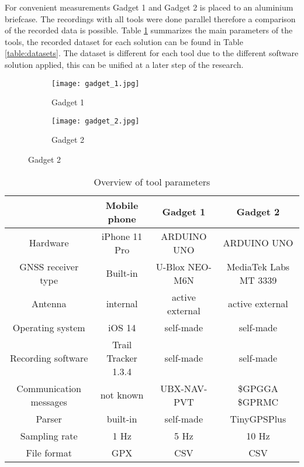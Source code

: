\documentclass{article}
\begin{document}
			For convenient measurements Gadget 1 and Gadget 2 is placed to an aluminium briefcase. The recordings with all tools were done parallel therefore a comparison of the recorded data is possible. Table \ref{table:toolparams} summarizes the main parameters of the tools, the recorded dataset for each solution can be found in Table \ref{table:datasets}. The dataset is different for each tool due to the different software solution applied, this can be unified at a later step of the research.
			\begin{figure}[h]
		   		\centering
		     	\begin{subfigure}[b]{0.45\textwidth}
		      		\centering
		      	  	\texttt{[image: gadget\_1.jpg]}
		      	   \caption{Gadget 1}
		      	   \label{fig:gadget1}
		     	\end{subfigure}
		     	\begin{subfigure}[b]{0.45\textwidth}
		      	   \centering
		      	   \texttt{[image: gadget\_2.jpg]}
		      	   \caption{Gadget 2}
		      	   \label{fig:gadget2}
		     	\end{subfigure}
		      \caption{Gadget 2}
		      \label{fig:gadgets}
			\end{figure}		
			\begin{table}[h]
				\centering
				\begin{tabular}{|c|c|c|c|}
					\hline 
					& Mobile phone & Gadget 1 & Gadget 2 \\ 
					\hline 
					Hardware & iPhone 11 Pro & ARDUINO UNO & ARDUINO UNO \\ 
					\hline 
					GNSS receiver type & Built-in & U-Blox NEO-M6N & MediaTek Labs MT 3339 \\ 
					\hline 
					Antenna & internal & active external & active external \\ 
					\hline 
					Operating system & iOS 14 & self-made & self-made \\ 
					\hline 
					Recording software & Trail Tracker 1.3.4 & self-made & self-made \\ 
					\hline 
					Communication messages & not known & UBX-NAV-PVT & \$GPGGA \$GPRMC \\ 
					\hline 
					Parser & built-in & self-made & TinyGPSPlus \\
					\hline 
					Sampling rate & 1 Hz & 5 Hz & 10 Hz \\ 
					\hline 
					File format & GPX & CSV & CSV \\ 
					\hline 
				\end{tabular} 
				\caption{Overview of tool parameters}
				\label{table:toolparams}
			\end{table}
\end{document}
